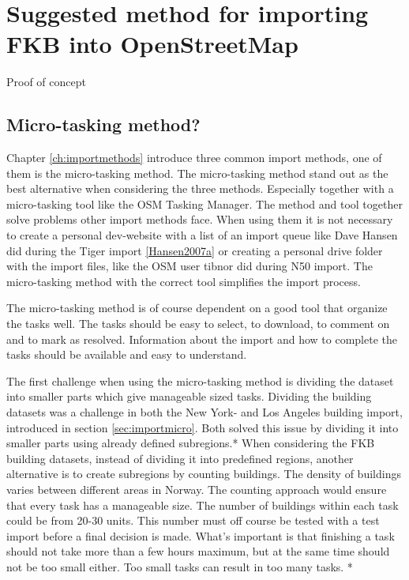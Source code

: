 \chapter{Suggested method for importing FKB into OpenStreetMap}
Proof of concept 

\section{Micro-tasking method?}
Chapter \ref{ch:importmethods} introduce three common import methods, one of them is the micro-tasking method. The micro-tasking method stand out as the best alternative when considering the three methods. Especially together with a micro-tasking tool like the OSM Tasking Manager. The method and tool together solve problems other import methods face. When using them it is not necessary to create a personal dev-website with a list of an import queue like Dave Hansen did during the Tiger import \ref{Hansen2007a} or creating a personal drive folder with the import files, like the OSM user tibnor did during N50 import. The micro-tasking method with the correct tool simplifies the import process.  

The micro-tasking method is of course dependent on a good tool that organize the tasks well. The tasks should be easy to select, to download, to comment on and to mark as resolved. Information about the import and how to complete the tasks should be available and easy to understand. 

The first challenge when using the micro-tasking method is dividing the dataset into smaller parts which give manageable sized tasks. Dividing the building datasets was a challenge in both the New York- and Los Angeles building import, introduced in section \ref{sec:importmicro}. Both solved this issue by dividing it into smaller parts using already defined subregions.*%
 When considering the FKB building datasets, instead of dividing it into predefined regions, another alternative is to create subregions by counting buildings. The density of buildings varies between different areas in Norway. %
 The counting approach would ensure that every task has a manageable size. The number of buildings within each task could be from 20-30 units. This number must off course be tested with a test import before a final decision is made. What's important is that finishing a task should not take more than a few hours maximum, but at the same time should not be too small either. Too small tasks can result in too many tasks. *%
  
